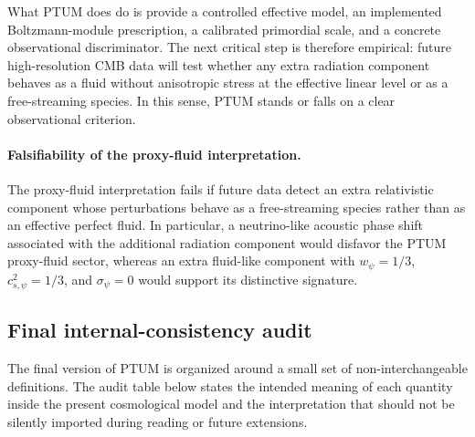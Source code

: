 \documentclass[epj]{svjour}
\begin{document}
What PTUM does do is provide a controlled effective model, an implemented
Boltzmann-module prescription, a calibrated primordial scale, and a concrete
observational discriminator. The next critical step is therefore
empirical: future high-resolution CMB data will
test whether any extra radiation component behaves as a fluid
without anisotropic stress at the effective linear level or as a
free-streaming species. In this
sense, PTUM stands or falls on a clear observational criterion.

\paragraph{Falsifiability of the proxy-fluid interpretation.}
The proxy-fluid interpretation fails if future data detect an extra relativistic
component whose perturbations behave as a free-streaming species rather than as
an effective perfect fluid.  In particular, a neutrino-like acoustic phase shift
associated with the additional radiation component would disfavor the PTUM
proxy-fluid sector, whereas an extra fluid-like component with
$w_\psi=1/3$, $c_{s,\psi}^2=1/3$, and $\sigma_\psi=0$ would support its
distinctive signature.

\subsection{Final internal-consistency audit}
\label{sec:final_internal_audit}

The final version of PTUM is organized around a small set of non-interchangeable
definitions.  The audit table below states the intended meaning of each quantity
inside the present cosmological model and the interpretation that should not be
silently imported during reading or future extensions.
\end{document}
